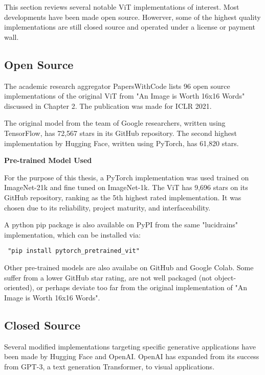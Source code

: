 This section reviews several notable ViT implementations of interest.
Most developments have been made open source. Howerver, some of the 
highest quality implementations are still closed source and operated 
under a license or payment wall.

\subsection{Open Source}

The academic research aggregator PapersWithCode lists 96 open source implementations of 
the original ViT from "An Image is Worth 16x16 Words" discussed in Chapter 2. 
The publication was made for ICLR 2021. \citep{Papers16}

The original model from the team of Google researchers, written using TensorFlow, has 72,567 stars in its GitHub repository.
The second highest implementation by Hugging Face, written using PyTorch, has 61,820 stars. 


\vspace{5mm}

\textbf{Pre-trained Model Used}

For the purpose of this thesis, a PyTorch implementation was used trained on ImageNet-21k
and fine tuned on ImageNet-1k. The ViT has 9,696 stars on its GitHub repository,
ranking as the 5th highest rated implementation. It was chosen due to its reliability,
project maturity, and interfaceability. \citep{Papers16}

\vspace{5mm}

A python pip package is also available on PyPI from the same "lucidrains" implementation,
which can be installed via: 
\begin{verbatim} "pip install pytorch_pretrained_vit" \end{verbatim}


Other pre-trained models are also availabe on GitHub and Google Colab. 
Some suffer from a lower GitHub star rating, are not well packaged (not object-oriented), or perhaps deviate too far
from the original implementation of "An Image is Worth 16x16 Words". 


\subsection{Closed Source}


Several modified implementations targeting specific generative applications have been made by Hugging Face and OpenAI.
OpenAI has expanded from its success from GPT-3, a text generation Transformer, to visual applications.

